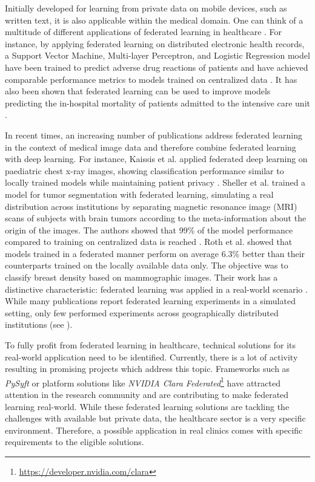 Initially developed for learning from private data on mobile devices, such as written text, it is also applicable within the medical domain. One can think of a multitude of different applications of federated learning in healthcare \cite{Xu2021}. For instance, by applying federated learning on distributed electronic health records, a Support Vector Machine, Multi-layer Perceptron, and Logistic Regression model have been trained to predict adverse drug reactions of patients and have achieved comparable performance metrics to models trained on centralized data \cite{Choudhury2019PredictingLearning}. It has also been shown that federated learning can be used to improve models predicting the in-hospital mortality of patients admitted to the intensive care unit \cite{Sharma2019PreservingMortality}.

In recent times, an increasing number of publications address federated learning in the context of medical image data and therefore combine federated learning with deep learning.
For instance, Kaissis et al. applied federated deep learning on paediatric chest x-ray images, showing classification performance similar to locally trained models while maintaining patient privacy \cite{Kaissis2021End-to-endImaging}.
Sheller et al. trained a model for tumor segmentation with federated learning, simulating a real distribution across institutions by separating  magnetic resonance image (MRI) scans of subjects with brain tumors according to the meta-information about the origin of the images. The authors showed that 99\% of the model performance compared to training on centralized data is reached \cite{Sheller2020FederatedData}.
Roth et al. showed that models trained in a federated manner perform on average 6.3\% better than their counterparts trained on the locally available data only. The objective was to classify breast density based on mammographic images. Their work has a distinctive characteristic: federated learning was applied in a real-world scenario \cite{Roth2020FederatedImplementation}.
While many publications report federated learning experiments in a simulated setting, only few performed experiments across geographically distributed institutions (see ).

To fully profit from federated learning in healthcare, technical solutions for its real-world application need to be identified. Currently, there is a lot of activity resulting in promising projects which address this topic. Frameworks such as \textit{PySyft} \cite{Ryffel2018ALearning} or platform solutions like \textit{NVIDIA Clara Federated}\footnote{\url{https://developer.nvidia.com/clara}} have attracted attention in the research community and are contributing to make federated learning real-world. While these federated learning solutions are tackling the challenges with available but private data, the healthcare sector is a very specific environment. Therefore, a possible application in real clinics comes with specific requirements to the eligible solutions.

